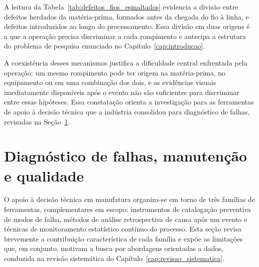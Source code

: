 A leitura da Tabela~\ref{tab:defeitos_fios_esmaltados} evidencia a divisão entre defeitos herdados da matéria-prima, formados antes da chegada do fio à linha, e defeitos introduzidos ao longo do processamento. Essa divisão em duas origens é a que a operação precisa discriminar a cada rompimento e antecipa a estrutura do problema de pesquisa enunciado no Capítulo~\ref{cap:introducao}.


A coexistência desses mecanismos justifica a dificuldade central enfrentada pela operação: um mesmo rompimento pode ter origem na matéria-prima, no equipamento ou em uma combinação dos dois, e as evidências visuais imediatamente disponíveis após o evento não são suficientes para discriminar entre essas hipóteses. Essa constatação orienta a investigação para as ferramentas de apoio à decisão técnica que a indústria consolidou para diagnóstico de falhas, revisadas na Seção~\ref{sec:diagnostico}.


\section{Diagnóstico de falhas, manutenção e qualidade}
\label{sec:diagnostico}


O apoio à decisão técnica em manufatura organiza-se em torno de três famílias de ferramentas, complementares em escopo: instrumentos de catalogação preventiva de modos de falha, métodos de análise retrospectiva de causa após um evento e técnicas de monitoramento estatístico contínuo do processo. Esta seção revisa brevemente a contribuição característica de cada família e expõe as limitações que, em conjunto, motivam a busca por abordagens orientadas a dados, conduzida na revisão sistemática do Capítulo~\ref{cap:revisao_sistematica}.

